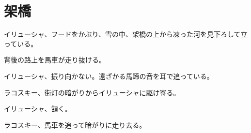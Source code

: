 \section*{架橋}

イリューシャ、フードをかぶり、雪の中、架橋の上から凍った河を見下ろして立っている。

背後の路上を馬車が走り抜ける。

イリューシャ、振り向かない。遠ざかる馬蹄の音を耳で追っている。

ラコスキー、街灯の暗がりからイリューシャに駆け寄る。

イリューシャ、頷く。

ラコスキー、馬車を追って暗がりに走り去る。

